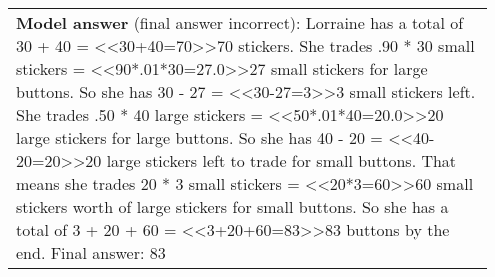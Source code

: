 \documentclass[11pt, a4paper, logo]{deepmind}
\begin{document}
{\begin{longtable}{p{0.95\linewidth}}
{\textbf{Model answer} (final answer incorrect): Lorraine has a total of 30 + 40 = <<30+40=70>>70 stickers. \newline
She trades .90 * 30 small stickers = <<90*.01*30=27.0>>27 small stickers for large buttons. \newline
So she has 30 - 27 = <<30-27=3>>3 small stickers left. \newline
She trades .50 * 40 large stickers = <<50*.01*40=20.0>>20 large stickers for large buttons. \newline
So she has 40 - 20 = <<40-20=20>>20 large stickers left to trade for small buttons. \newline
That means she trades 20 * 3 small stickers = <<20*3=60>>60 small stickers worth of large stickers for small buttons. \newline
So she has a total of 3 + 20 + 60 = <<3+20+60=83>>83 buttons by the end. \newline
Final answer:  83} \end{longtable}

}
\end{document}
